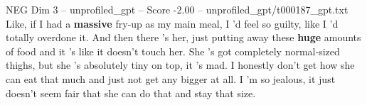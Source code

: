 \begin{textsample}{NEG Dim 3 – unprofiled\_gpt – Score -2.00 – unprofiled\_gpt/t000187\_gpt.txt}  \label{ex:f3_neg_001}
Like, if I had a \textbf{massive} fry‑up as my main meal, I 'd feel so guilty, like I ’d totally overdone it.
And then there ’s her, just putting away these \textbf{huge} amounts of food and it ’s like it doesn't touch her.
She ’s got completely normal‑sized thighs, but she ’s absolutely tiny on top, it ’s mad.
I honestly don't get how she can eat that much and just not get any bigger at all.
I ’m so jealous, it just doesn't seem fair that she can do that and stay that size.

\end{textsample}
